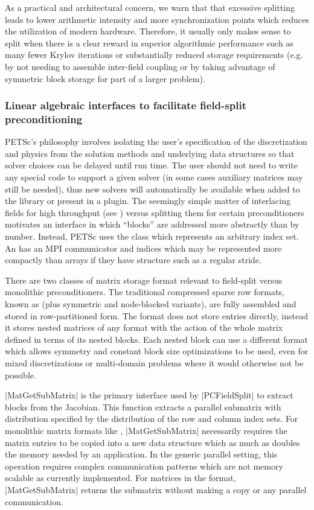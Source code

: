 As a practical and architectural concern, we warn that that excessive splitting leads to lower arithmetic intensity and more synchronization points which reduces the utilization of modern hardware.
Therefore, it usually only makes sense to split when there is a clear reward in superior algorithmic performance such as many fewer Krylov iterations or substantially reduced storage requirements (e.g. by not needing to assemble inter-field coupling or by taking advantage of symmetric block storage for part of a larger problem).

\subsubsection{Linear algebraic interfaces to facilitate field-split preconditioning}
PETSc's philosophy involves isolating the user's specification of the discretization and physics from the solution methods and underlying data structures so that solver choices can be delayed until run time.
The user should not need to write any special code to support a given solver (in some cases auxiliary matrices may still be needed), thus new solvers will automatically be available when added to the library or present in a plugin.
The seemingly simple matter of interlacing fields for high throughput (see ) versus splitting them for certain preconditioners motivates an interface in which ``blocks'' are addressed more abstractly than by number.
Instead, PETSc uses the  class which represents an arbitrary index set.
An  has an MPI communicator and indices which may be represented more compactly than arrays if they have structure such as a regular stride.

There are two classes of matrix storage format relevant to field-split versus monolithic preconditioners.
The traditional compressed sparse row formats, known as  (plus symmetric and node-blocked variants), are fully assembled and stored in row-partitioned form.
The  format does not store entries directly, instead it stores nested matrices of any format with the action of the whole matrix defined in terms of its nested blocks.
Each nested block can use a different format which allows symmetry and constant block size optimizations to be used, even for mixed discretizations or multi-domain problems where it would otherwise not be possible.

\cfunc|MatGetSubMatrix| is the primary interface used by \cverb|PCFieldSplit| to extract blocks from the Jacobian.
This function extracts a parallel submatrix with distribution specified by the distribution of the row and column index sets.
For monolithic matrix formats like , \cfunc|MatGetSubMatrix| necessarily requires the matrix entries to be copied into a new data structure which as much as doubles the memory needed by an application.
In the generic parallel setting, this operation requires complex communication patterns which are not memory scalable as currently implemented.
For matrices in the  format, \cfunc|MatGetSubMatrix| returns the submatrix without making a copy or any parallel communication.

